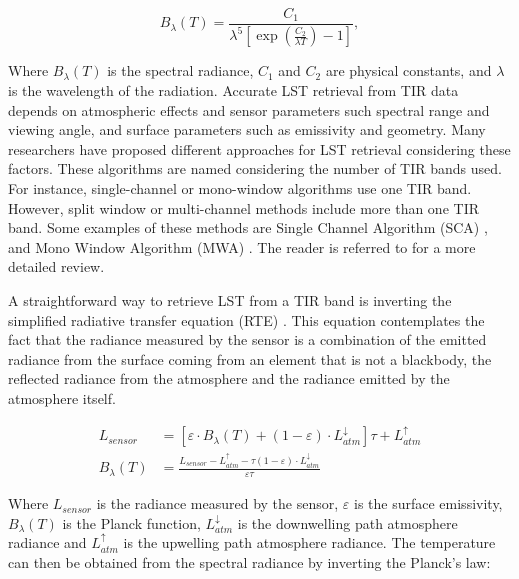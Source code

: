         \begin{equation}
            B_{\lambda}(T) = \frac{C_1}{\lambda^5 \left[ \exp\left(\frac{C_2}{\lambda T}\right) - 1\right]},
        \end{equation}

        Where $B_{\lambda}(T)$ is the spectral radiance, $C_1$ and $C_2$ are physical constants, and $\lambda$ is the wavelength of the radiation. 
        Accurate LST retrieval from TIR data depends on atmospheric effects and sensor parameters such spectral range and viewing angle, and surface parameters such as emissivity and geometry. Many researchers have proposed different approaches for LST retrieval considering these factors.
        These algorithms are named considering the number of TIR bands used. For instance, single-channel or mono-window algorithms use one TIR band. However, split window or multi-channel methods include more than one TIR band. Some examples of these methods are Single Channel Algorithm (SCA) \cite{sca2009}, and Mono Window Algorithm (MWA) \cite{mwa2001}. The reader is referred to \cite{LI201314} for a more detailed review.


        A straightforward way to retrieve LST from a TIR band is inverting the simplified radiative transfer equation (RTE) \cite{becker90}. This equation contemplates the fact that the radiance measured by the sensor is a combination of the emitted radiance from the surface coming from an element that is not a blackbody, the reflected radiance from the atmosphere and the radiance emitted by the atmosphere itself.


        \begin{equation}
            \begin{aligned}
            L_{sensor} &= \left[ \varepsilon \cdot B_{\lambda}(T) + (1 - \varepsilon) \cdot L_{atm}^{\downarrow} \right] \tau + L_{atm}^{\uparrow} \\
            B_\lambda (T) &= \frac{L_{sensor} - L_{atm}^{\uparrow}- \tau (1 - \varepsilon) \cdot L_{atm}^{\downarrow}}{\varepsilon \tau} 
            \end{aligned}
        \end{equation}

        Where $L_{sensor}$ is the radiance measured by the sensor, $\varepsilon$ is the surface emissivity, $B_{\lambda}(T)$ is the Planck function, $L_{atm}^{\downarrow}$ is the downwelling path atmosphere radiance and $L_{atm}^{\uparrow}$ is the upwelling path atmosphere radiance. 
        The temperature can then be obtained from the spectral radiance by inverting the Planck's law:

